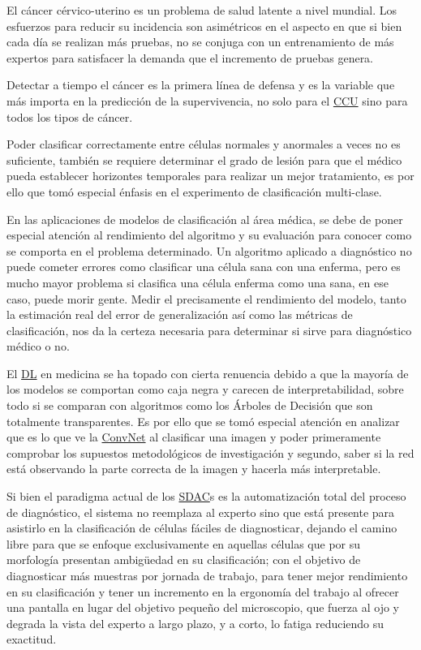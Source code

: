 El cáncer cérvico-uterino es un problema de salud latente a nivel mundial. Los
esfuerzos para reducir su incidencia son asimétricos en el aspecto en que si
bien cada día se realizan más pruebas, no se conjuga con un entrenamiento de más
expertos para satisfacer la demanda que el incremento de pruebas genera.

Detectar a tiempo el cáncer es la primera línea de defensa y es la variable que
más importa en la predicción de la supervivencia, no solo para el
\hyperlink{abbr}{CCU} sino para todos los tipos de cáncer.

Poder clasificar correctamente entre células normales y anormales a veces no
es suficiente, también se requiere determinar el grado de lesión para que el
médico pueda establecer horizontes temporales para realizar un mejor
tratamiento, es por ello que tomó especial énfasis en el experimento de
clasificación multi-clase.

En las aplicaciones de modelos de clasificación al área médica, se debe de poner
especial atención al rendimiento del algoritmo y su evaluación para conocer como
se comporta en el problema determinado. Un algoritmo aplicado a diagnóstico no
puede cometer errores como clasificar una célula sana con una enferma, pero es
mucho mayor problema si clasifica una célula enferma como una sana, en ese caso,
puede morir gente. Medir el precisamente el rendimiento del modelo, tanto la
estimación real del error de generalización así como las métricas de
clasificación, nos da la certeza necesaria para determinar si sirve para
diagnóstico médico o no.

El \hyperlink{abbr}{DL} en medicina se ha topado con cierta renuencia debido a
que la mayoría de los modelos se comportan como caja negra y carecen de
interpretabilidad, sobre todo si se comparan con algoritmos como los Árboles de
Decisión que son totalmente transparentes. Es por ello que se tomó especial
atención en analizar que es lo que ve la \hyperlink{abbr}{ConvNet} al clasificar
una imagen y poder primeramente comprobar los supuestos metodológicos de
investigación y segundo, saber si la red está observando la parte correcta de la
imagen y hacerla más interpretable.

Si bien el paradigma actual de los \hyperlink{abbr}{SDAC}s es la automatización
total del proceso de diagnóstico, el sistema no reemplaza al experto sino que
está presente para asistirlo en la clasificación de células fáciles de
diagnosticar, dejando el camino libre para que se enfoque exclusivamente en
aquellas células que por su morfología presentan ambigüedad en su clasificación;
con el objetivo de diagnosticar más muestras por jornada de trabajo, para tener
mejor rendimiento en su clasificación y tener un incremento en la ergonomía del
trabajo al ofrecer una pantalla en lugar del objetivo pequeño del microscopio,
que fuerza al ojo y degrada la vista del experto a largo plazo, y a corto, lo
fatiga reduciendo su exactitud.

